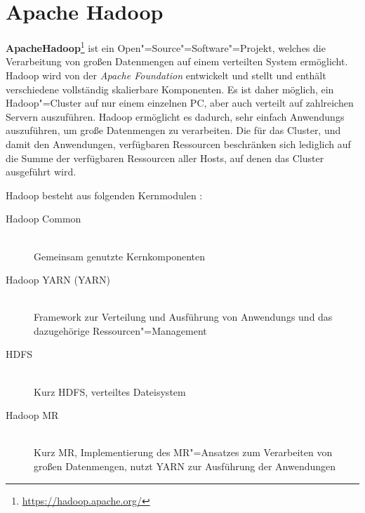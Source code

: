 \section{Apache Hadoop}
\label{sec:hadoop}

\textbf{Apache\texttrademark Hadoop\textregistered}\footnote{\url{https://hadoop.apache.org/}} ist ein Open"=Source"=Software"=Projekt, welches die Verarbeitung von großen Datenmengen auf einem verteilten System ermöglicht.
Hadoop wird von der \emph{Apache Foundation} entwickelt und stellt und enthält verschiedene vollständig skalierbare Komponenten.
Es ist daher möglich, ein Hadoop"=Cluster auf nur einem einzelnen PC, aber auch verteilt auf zahlreichen Servern auszuführen.
Hadoop ermöglicht es dadurch, sehr einfach \glspl{Anwendung} auszuführen, um große Datenmengen zu verarbeiten.
Die für das Cluster, und damit den Anwendungen, verfügbaren Ressourcen beschränken sich lediglich auf die Summe der verfügbaren Ressourcen aller Hosts, auf denen das Cluster ausgeführt wird.

Hadoop besteht aus folgenden Kernmodulen \cite{HadoopHomePage}:

\begin{description}
	\item[Hadoop Common] \hfill \\
        Gemeinsam genutzte Kernkomponenten
	\item[Hadoop \acrshort{YARN} (\acrlong{YARN})] \hfill \\
        Framework zur Verteilung und Ausführung von \glspl{Anwendung} und das dazugehörige Ressourcen"=Management
	\item[\acrlong{HDFS}] \hfill \\
        Kurz \acrshort{HDFS}, verteiltes Dateisystem
	\item[Hadoop \acrlong{MR}] \hfill \\
        Kurz \acrshort{MR}, Implementierung des \gls{MR}"=Ansatzes zum Verarbeiten von großen Datenmengen, nutzt \gls{YARN} zur Ausführung der Anwendungen
\end{description}

